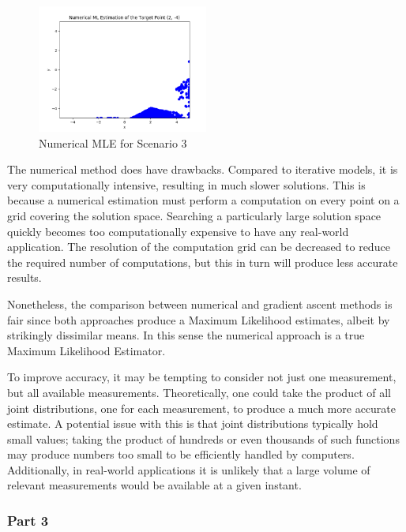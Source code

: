 \documentclass[a4paper]{article}
\begin{document}
\begin{figure}[h]
	\begin{center}
		\includegraphics[width=0.5\textwidth]{numerical_mle.png}
		\caption{Numerical MLE for Scenario 3}
	\end{center}
\end{figure}

The numerical method does have drawbacks.  Compared to iterative models, it is very computationally intensive, resulting in much slower solutions.  This is because a numerical estimation must perform a computation on every point on a grid covering the solution space.  Searching a particularly large solution space quickly becomes too computationally expensive to have any real-world application.  The resolution of the computation grid can be decreased to reduce the required number of computations, but this in turn will produce less accurate results.

Nonetheless, the comparison between numerical and gradient ascent methods is fair since both approaches produce a Maximum Likelihood estimates, albeit by strikingly dissimilar means.  In this sense the numerical approach is a true Maximum Likelihood Estimator.

To improve accuracy, it may be tempting to consider not just one measurement, but all available measurements.  Theoretically, one could take the product of all joint distributions, one for each measurement, to produce a much more accurate estimate.  A potential issue with this is that joint distributions typically hold small values; taking the product of hundreds or even thousands of such functions may produce numbers too small to be efficiently handled by computers.  Additionally, in real-world applications it is unlikely that a large volume of relevant measurements would be available at a given instant.

\subsubsection*{Part 3}
\end{document}
